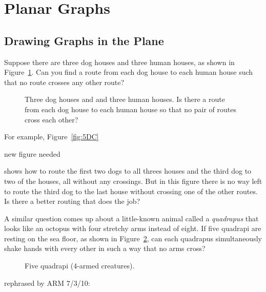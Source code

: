 \section{Planar Graphs}\label{planar_graphs_sec}

\subsection{Drawing Graphs in the Plane}

Suppose there are three dog houses and three human houses, as shown in
Figure~\ref{fig:5DP}.  Can you find a route from each dog house to
each human house such that no route crosses any other route?

\begin{figure}


\caption{Three dog houses and and three human houses.  Is there a
  route from each dog house to each human house so that no pair of
  routes cross each other?}
\label{fig:5DP}
\end{figure}

For example, Figure~\ref{fig:5DC} \begin{editingnotes}
new figure needed
\end{editingnotes} shows how to route the first two dogs to all threes
houses and the third dog to two of the houses, all without any crossings.
But in this figure there is no way left to route the third dog to the last
house without crossing one of the other routes.  Is there a better routing
that does the job?

A similar question comes up about a little-known animal called a
\emph{quadrapus} that looks like an octopus with four stretchy arms
instead of eight.  If five quadrapi are resting on the sea floor, as shown
in Figure~\ref{fig:5DA}, can each quadrapus simultaneously shake hands
with every other in such a way that no arms cross?

\begin{figure}


\caption{Five quadrapi (4-armed creatures).}

\label{fig:5DA}

\end{figure}

\begin{staffnotes}
rephrased by ARM 7/3/10:
\end{staffnotes}

